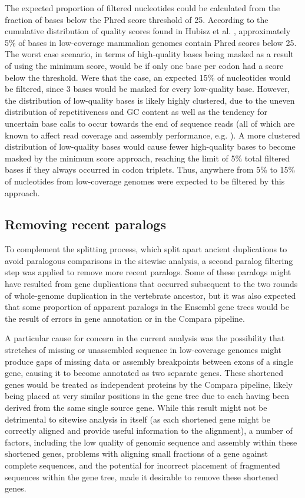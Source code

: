 The expected proportion of filtered nucleotides could be calculated from
the fraction of bases below the Phred score threshold of 25. According
to the cumulative distribution of quality scores found in Hubisz et
al. \citeyearpar{Hubisz2011}, approximately 5\% of bases in low-coverage
mammalian genomes contain Phred scores below 25. The worst case
scenario, in terms of high-quality bases being masked as a result of
using the minimum score, would be if only one base per codon had a
score below the threshold. Were that the case, an expected 15\% of
nucleotides would be filtered, since 3 bases would be masked for every
low-quality base. However, the distribution of low-quality bases is
likely highly clustered, due to the uneven distribution of
repetitiveness and GC content as well as the tendency for uncertain
base calls to occur towards the end of sequence reads (all of which
are known to affect read coverage and assembly performance,
e.g. \cite{Teytelman2009}). A more clustered
distribution of low-quality bases would cause fewer high-quality bases
to become masked by the minimum score approach, reaching the limit of
5\% total filtered bases if they always occurred in codon
triplets. Thus, anywhere from 5\% to 15\% of nucleotides from
low-coverage genomes were expected to be filtered by this approach.

\subsection{Removing recent paralogs}
\label{section_removing_paralogs}

To complement the \subtr{} splitting process, which split apart
ancient duplications to avoid paralogous comparisons in the sitewise
analysis, a second paralog filtering step was applied to remove more
recent paralogs. Some of these paralogs might have resulted from gene
duplications that occurred subsequent to the two rounds of
whole-genome duplication in the vertebrate ancestor, but it was also
expected that some proportion of apparent paralogs in the Ensembl gene
trees would be the result of errors in gene annotation or in the
Compara pipeline.

A particular cause for concern in the current analysis was the
possibility that stretches of missing or unassembled sequence in
low-coverage genomes might produce gaps of missing data or assembly
breakpoints between exons of a single gene, causing it to become
annotated as two separate genes. These shortened genes would be
treated as independent proteins by the Compara pipeline, likely being
placed at very similar positions in the gene tree due to each having
been derived from the same single source gene. While this result might
not be detrimental to sitewise analysis in itself (as each shortened
gene might be correctly aligned and provide useful information to the
alignment), a number of factors, including the low quality of genomic
sequence and assembly within these shortened genes, problems with
aligning small fractions of a gene against complete sequences, and the
potential for incorrect placement of fragmented sequences within the
gene tree, made it desirable to remove these shortened genes.

